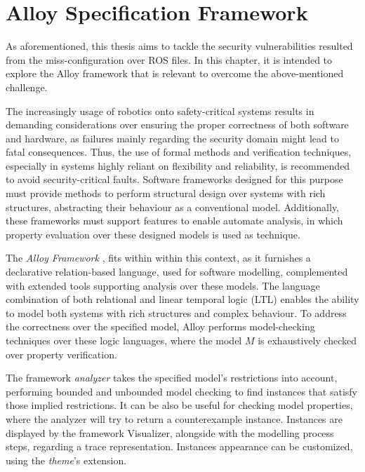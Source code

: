 \chapter{Alloy Specification Framework}\label{c:alloy}

As aforementioned, this thesis aims to tackle the security vulnerabilities resulted from the miss-configuration over ROS files. In this chapter, it is intended to explore the Alloy framework that is relevant to overcome the above-mentioned challenge. %

The increasingly usage of robotics onto safety-critical systems results in demanding considerations over ensuring the proper correctness of both software and hardware, as failures mainly regarding the security domain might lead to fatal consequences. Thus, the use of formal methods and verification techniques, especially in systems highly reliant on flexibility and reliability, is recommended to avoid security-critical faults. \cite{carvalho2020analysis, clarke2011model} Software frameworks designed for this purpose must provide methods to perform structural design over systems with rich structures, abstracting their behaviour as a conventional model. Additionally, these frameworks must support features to enable automate analysis, in which property evaluation over these designed models is used as technique. 

The \textit{Alloy Framework} \cite{alloy-DJ}, fits within within this context, as it furnishes a declarative relation-based language, used for software modelling, complemented with extended tools supporting analysis over these models. \cite{alloy-6} The language combination of both relational and linear temporal logic (LTL) enables the ability to model both systems with rich structures and complex behaviour. To address the correctness over the specified model, Alloy performs model-checking techniques over these logic languages, where the model $M$ is exhaustively checked over property verification. \cite{lwspecification, carvalho2020analysis}

The framework \textit{analyzer} takes the specified model's restrictions into account, performing bounded and unbounded model checking to find instances that satisfy those implied restrictions. It can be also be useful for checking model properties, where the analyzer will try to return a counterexample instance. Instances are displayed by the framework Visualizer, alongside with the modelling process steps, regarding a trace representation. Instances appearance can be customized, using the \textit{theme}'s extension. \cite{alloy-6}


